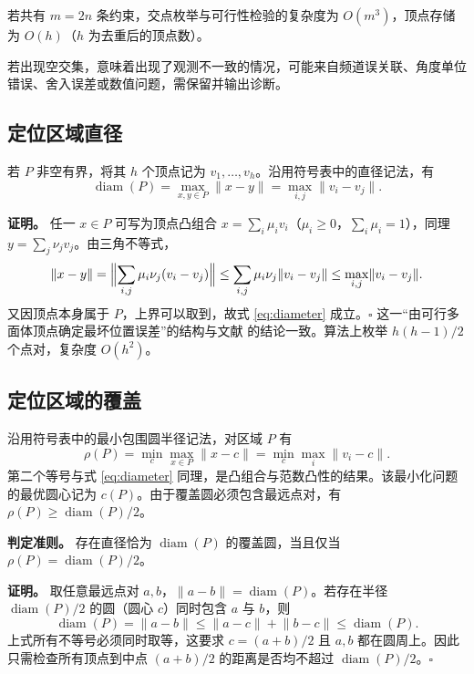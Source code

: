 \documentclass[UTF8,a4paper,zihao=-4,fontset=none]{ctexart}
\begin{document}
若共有 \(m=2n\) 条约束，交点枚举与可行性检验的复杂度为 \(O(m^3)\)，顶点存储为 \(O(h)\)（\(h\) 为去重后的顶点数）。

若出现空交集，意味着出现了观测不一致的情况，可能来自频道误关联、角度单位错误、舍入误差或数值问题，需保留并输出诊断。

\subsection{定位区域直径}

若 \(P\) 非空有界，将其 \(h\) 个顶点记为 \(v_1,\dots,v_h\)。沿用符号表中的直径记法，有
\begin{equation}
  \operatorname{diam}(P)=\max_{x,y\in P}\lVert x-y\rVert=\max_{i,j}\lVert v_i-v_j\rVert .
  \label{eq:diameter}
\end{equation}

\textbf{证明。} 任一 \(x\in P\) 可写为顶点凸组合 \(x=\sum_i\mu_iv_i\)（\(\mu_i\ge0\)，\(\sum_i\mu_i=1\)），同理 \(y=\sum_j\nu_jv_j\)。由三角不等式，
\begin{equation}
  \lVert x-y\rVert
  =\Bigl\lVert\sum_{i,j}\mu_i\nu_j(v_i-v_j)\Bigr\rVert
  \le\sum_{i,j}\mu_i\nu_j\lVert v_i-v_j\rVert
  \le\max_{i,j}\lVert v_i-v_j\rVert .
\end{equation}
又因顶点本身属于 \(P\)，上界可以取到，故式 \eqref{eq:diameter} 成立。\(\square\) 
这一“由可行多面体顶点确定最坏位置误差”的结构与文献 \cite{Gholami2015} 的结论一致。算法上枚举 \(h(h-1)/2\) 个点对，复杂度 \(O(h^2)\)。

\subsection{定位区域的覆盖}

沿用符号表中的最小包围圆半径记法，对区域 \(P\) 有
\begin{equation}
  \rho(P)=\min_c\max_{x\in P}\lVert x-c\rVert
  =\min_c\max_i\lVert v_i-c\rVert .
  \label{eq:mincircle}
\end{equation}
第二个等号与式 \eqref{eq:diameter} 同理，是凸组合与范数凸性的结果。该最小化问题的最优圆心记为 \(c(P)\)。由于覆盖圆必须包含最远点对，有 \(\rho(P)\ge\operatorname{diam}(P)/2\)。

\textbf{判定准则。} 存在直径恰为 \(\operatorname{diam}(P)\) 的覆盖圆，当且仅当 \(\rho(P)=\operatorname{diam}(P)/2\)。

\textbf{证明。} 取任意最远点对 \(a,b\)，\(\lVert a-b\rVert=\operatorname{diam}(P)\)。若存在半径 \(\operatorname{diam}(P)/2\) 的圆（圆心 \(c\)）同时包含 \(a\) 与 \(b\)，则
\begin{equation}
  \operatorname{diam}(P)=\lVert a-b\rVert\le\lVert a-c\rVert+\lVert b-c\rVert\le\operatorname{diam}(P) .
\end{equation}
上式所有不等号必须同时取等，这要求 \(c=(a+b)/2\) 且 \(a,b\) 都在圆周上。因此只需检查所有顶点到中点 \((a+b)/2\) 的距离是否均不超过 \(\operatorname{diam}(P)/2\)。\(\square\)
\end{document}
